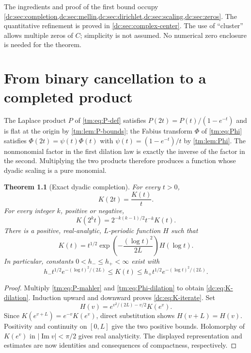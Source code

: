 \documentclass[11pt,a4paper,oneside,openany]{book}
\numberwithin{equation}{chapter}
\newtheorem{theorem}{Theorem}[chapter]
\theoremstyle{definition}
\theoremstyle{remark}
\newcommand{\abs}[1]{\left\lvert #1\right\rvert}
\DeclareMathOperator{\Ima}{Im}
\begin{document}
The ingredients and proof of the first bound occupy
\cref{dc:sec:completion,dc:sec:mellin,dc:sec:dirichlet,dc:sec:scaling,dc:sec:zeros}.
The quantitative refinement is proved in \cref{dc:sec:complex-center}.
The use of ``cluster'' allows multiple zeros of $C$; simplicity is not
assumed. No numerical zero enclosure is needed for the theorem.

\chapter{From binary cancellation to a completed product}
\label{dc:sec:completion}
The Laplace product $P$ of \eqref{tm:eq:P-def} satisfies
$P(2t)=P(t)/(1-e^{-t})$ and is flat at the origin by
\cref{tm:lem:P-bounds}; the Fabius transform $\Phi$ of \eqref{tm:eq:Phi}
satisfies $\Phi(2t)=\psi(t)\Phi(t)$ with $\psi(t)=(1-e^{-t})/t$ by
\cref{tm:lem:Phi}. The nonmonomial factor in the first dilation law is
exactly the inverse of the factor in the second. Multiplying the two
products therefore produces a function whose dyadic scaling is a pure
monomial.


\begin{theorem}[Exact dyadic completion]
\label{dc:thm:completion}
For every $t>0$,
\begin{equation}
 \boxed{K(2t)=\frac{K(t)}t.}
 \label{dc:eq:K-dilation}
\end{equation}
For every integer $k$, positive or negative,
\begin{equation}
 K(2^kt)=2^{-k(k-1)/2}t^{-k}K(t).
 \label{dc:eq:K-iterate}
\end{equation}
There is a positive, real-analytic, $L$-periodic function $H$ such that
\begin{equation}
 \boxed{K(t)=t^{1/2}
  \exp\left(-\frac{(\log t)^2}{2L}\right)H(\log t).}
 \label{dc:eq:K-profile}
\end{equation}
In particular, constants $0<h_-\le h_+<\infty$ exist with
\begin{equation}
 h_-t^{1/2}e^{-(\log t)^2/(2L)}
 \le K(t)\le
 h_+t^{1/2}e^{-(\log t)^2/(2L)}.
 \label{dc:eq:K-bounds}
\end{equation}
\end{theorem}
\begin{proof}
Multiply \cref{tm:eq:P-mahler} and \cref{tm:eq:Phi-dilation} to obtain
\cref{dc:eq:K-dilation}. Induction upward and downward proves
\cref{dc:eq:K-iterate}. Set
\[
 H(v)=e^{v^2/(2L)-v/2}K(e^v).
\]
Since $K(e^{v+L})=e^{-v}K(e^v)$, direct substitution shows
$H(v+L)=H(v)$. Positivity and continuity on $[0,L]$ give the two
positive bounds. Holomorphy of $K(e^v)$ in $\abs{\Ima v}<\pi/2$
gives real analyticity. The displayed representation and estimates
are now identities and consequences of compactness, respectively.
\end{proof}
\end{document}
